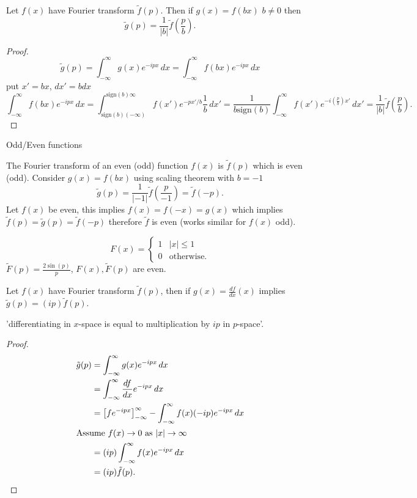 \documentclass[10pt, a4paper]{article}
\begin{document}
\begin{theorem}
    Let $f(x)$ have Fourier transform $\tilde{f}(p)$.
    Then if $g(x) = f(bx)$ $b \neq 0$ then
    \[
    \tilde{g}(p) = \frac{1}{|b|}\tilde{f}\left(\frac{p}{b}\right).
    \]

    \begin{proof}
        \[
        \tilde{g}(p) = \int_{-\infty}^{\infty}g(x)e ^ {-ipx}\,dx = \int_{-\infty}^{\infty}f(bx)e ^ {-ipx}\,dx
        \]
        put $x' = bx$,
        $dx' = bdx$
        \[
        \int_{-\infty}^{\infty}f(bx)e ^ {-ipx}\,dx = \int_{\mathrm{sign}(b)(-\infty)}^{\mathrm{sign}(b)\infty}f(x')e ^ {-px' / b}\frac{1}{b}\,dx' = \frac{1}{b\mathrm{sign}(b)}\int_{-\infty}^{\infty}f(x')e ^ {-i\left(\frac{p}{b}\right)x'}\,dx' = \frac{1}{|b|}\tilde{f}\left(\frac{p}{b}\right).
        \]
    \end{proof}
\end{theorem}

Odd/Even functions

The Fourier transform of an even
(odd)
function $f(x)$ is $\tilde{f}(p)$ which is even
(odd).
Consider $g(x) = f(bx)$ using scaling theorem with $b = -1$
\[
\tilde{g}(p) = \frac{1}{|-1|}\tilde{f}\left(\frac{p}{-1}\right) = \tilde{f}(-p).
\]
Let $f(x)$ be even,
this implies $f(x) = f(-x) = g(x)$ which implies $\tilde{f}(p) = \tilde{g}(p) = \tilde{f}(-p)$ therefore $\tilde{f}$ is even
(works similar for $f(x)$ odd).

\begin{example}
    \[
    F(x) = \begin{cases}
        1 & |x| \leq 1 \\
        0 & \text{otherwise}.
    \end{cases}
    \]
    $\tilde{F}(p) = \frac{2\sin(p)}{p}$,
    $F(x), \tilde{F}(p)$ are even.
\end{example}

\begin{theorem}
    Let $f(x)$ have Fourier transform $\tilde{f}(p)$,
    then if $g(x) = \frac{df}{dx}(x)$ implies $\tilde{g}(p) = (ip)\tilde{f}(p)$.

    'differentiating in $x$-space is equal to multiplication by $ip$ in $p$-space'.

    \begin{proof}
        \begin{align*}
            \tilde{g}(p) &= \int_{-\infty}^{\infty}g(x)e ^ {-ipx}\,dx \\
            &= \int_{-\infty}^{\infty}\frac{df}{dx}e ^ {-ipx}\,dx \\
            &= \left[fe ^ {-ipx}\right]_{-\infty}^{\infty} - \int_{-\infty}^{\infty}f(x)(-ip)e ^ {-ipx}\,dx \\
            \intertext{Assume $f(x) \to 0$ as $|x| \to \infty$}
            &= (ip)\int_{-\infty}^{\infty}f(x)e ^ {-ipx}\,dx \\
            &= (ip)\tilde{f}(p).
        \end{align*}
    \end{proof}
\end{theorem}
\end{document}
